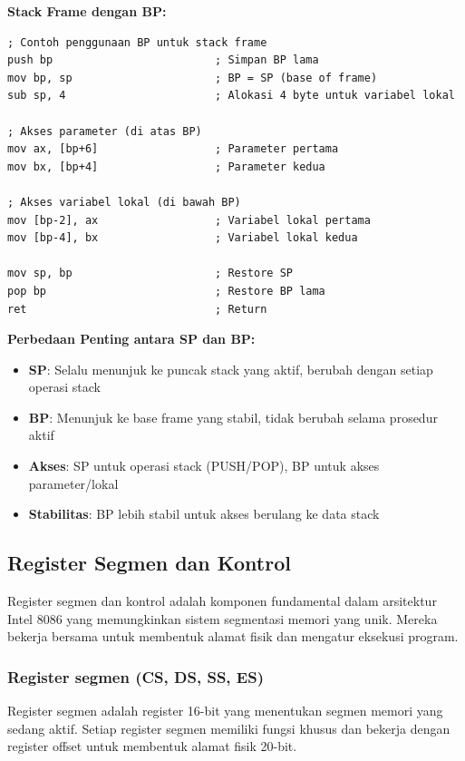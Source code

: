 \textbf{Stack Frame dengan BP:}
\begin{lstlisting}[language={[x86masm]Assembler}, caption=Stack Frame dengan Base Pointer, label=lst:stack-frame]
; Contoh penggunaan BP untuk stack frame
push bp                         ; Simpan BP lama
mov bp, sp                      ; BP = SP (base of frame)
sub sp, 4                       ; Alokasi 4 byte untuk variabel lokal

; Akses parameter (di atas BP)
mov ax, [bp+6]                  ; Parameter pertama
mov bx, [bp+4]                  ; Parameter kedua

; Akses variabel lokal (di bawah BP)
mov [bp-2], ax                  ; Variabel lokal pertama
mov [bp-4], bx                  ; Variabel lokal kedua

mov sp, bp                      ; Restore SP
pop bp                          ; Restore BP lama
ret                             ; Return
\end{lstlisting}


\textbf{Perbedaan Penting antara SP dan BP:}
\begin{itemize}
    \item \textbf{SP}: Selalu menunjuk ke puncak stack yang aktif, berubah dengan setiap operasi stack
    \item \textbf{BP}: Menunjuk ke base frame yang stabil, tidak berubah selama prosedur aktif
    \item \textbf{Akses}: SP untuk operasi stack (PUSH/POP), BP untuk akses parameter/lokal
    \item \textbf{Stabilitas}: BP lebih stabil untuk akses berulang ke data stack
\end{itemize}

\subsection{Register Segmen dan Kontrol}\label{subsec:arsitektur-segmen-kontrol}
Register segmen dan kontrol adalah komponen fundamental dalam arsitektur Intel 8086 yang memungkinkan sistem segmentasi memori yang unik. Mereka bekerja bersama untuk membentuk alamat fisik dan mengatur eksekusi program.

\subsubsection{Register segmen (CS, DS, SS, ES)}
Register segmen adalah register 16-bit yang menentukan segmen memori yang sedang aktif. Setiap register segmen memiliki fungsi khusus dan bekerja dengan register offset untuk membentuk alamat fisik 20-bit.

